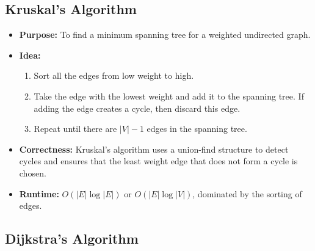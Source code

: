 \documentclass[landscape,7pt]{extarticle}
\begin{document}
\begin{multicols*}{3}
\subsection*{Kruskal's Algorithm}

\begin{itemize}
    \item \textbf{Purpose:} To find a minimum spanning tree for a weighted undirected graph.
    \item \textbf{Idea:}
    \begin{enumerate}
        \item Sort all the edges from low weight to high.
        \item Take the edge with the lowest weight and add it to the spanning tree. If adding the edge creates a cycle, then discard this edge.
        \item Repeat until there are $|V|-1$ edges in the spanning tree.
    \end{enumerate}
    \item \textbf{Correctness:} Kruskal's algorithm uses a union-find structure to detect cycles and ensures that the least weight edge that does not form a cycle is chosen.
    \item \textbf{Runtime:} $O(|E| \log |E|)$ or $O(|E| \log |V|)$, dominated by the sorting of edges.
\end{itemize}

\subsection*{Dijkstra's Algorithm}


\end{multicols*}
\end{document}
